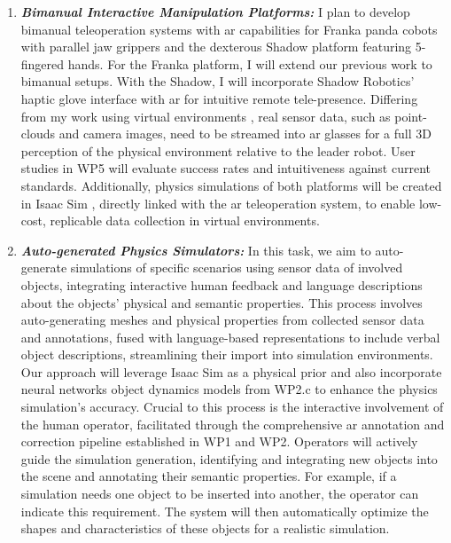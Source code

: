 \documentclass{erc-B2}
\begin{document}
\begin{enumerate}
\item \textit{\textbf{Bimanual Interactive Manipulation Platforms:}} I plan to develop bimanual teleoperation systems with \gls*{ar} capabilities for Franka panda cobots with parallel jaw grippers and the dexterous Shadow platform \cite{shadowrobotShadowRobot} featuring 5-fingered hands. For the Franka platform, I will extend our previous work \cite{jiang2023user} to bimanual setups. With the Shadow, I will incorporate Shadow Robotics' haptic glove interface with \gls*{ar} for intuitive remote tele-presence. Differing from my work using virtual environments \cite{jiang2023user}, real sensor data, such as point-clouds and camera images, need to be streamed into \gls*{ar} glasses for a full 3D perception of the physical environment relative to the leader robot. User studies in WP5 will evaluate success rates and intuitiveness against current standards. Additionally, physics simulations of both platforms will be created in Isaac Sim \cite{mittal2023orbit}, directly linked with the \gls*{ar} teleoperation system, to enable low-cost, replicable data collection in virtual environments.
\item  \textit{\textbf{Auto-generated Physics Simulators:}} In this task, we aim to auto-generate simulations of specific scenarios using sensor data of involved objects, integrating interactive human feedback and language descriptions about the objects' physical and semantic properties. This process involves auto-generating meshes and physical properties from collected sensor data and annotations, fused with language-based representations to include verbal object descriptions, streamlining their import into simulation environments.
Our approach will leverage Isaac Sim \cite{mittal2023orbit} as a physical prior and also incorporate neural networks object dynamics models from WP2.c to enhance the physics simulation's accuracy. Crucial to this process is the interactive involvement of the human operator, facilitated through the comprehensive \gls*{ar} annotation and correction pipeline established in WP1 and WP2. Operators will actively guide the simulation generation, identifying and integrating new objects into the scene and annotating their semantic properties.
For example, if a simulation needs one object to be inserted into another, the operator can indicate this requirement. The system will then automatically optimize the shapes and characteristics of these objects for a realistic simulation.



\end{enumerate}
\end{document}
